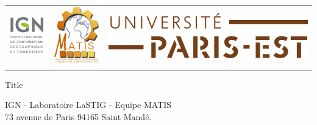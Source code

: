 \documentclass[a4paper,11pt]{article}
\begin{document}
\hspace{-1.0cm}
\begin{center}
\begin{tabular}{ccc}
\includegraphics[height=0.08\textheight]{images/logo_ign.jpg} & \includegraphics[height=0.08\textheight]{images/matis.jpg} & \includegraphics[height=0.06\textheight]{images/logo_paris_est}\\
\end{tabular}
\end{center}
\vspace{1ex}
\begin{center}
\Large{
Title
}
\end{center}

\vspace{0.5cm}
\begin{center}
IGN - Laboratoire LaSTIG - Equipe MATIS\\73 avenue de Paris 94165 Saint Mandé.
\end{center}
\end{document}
